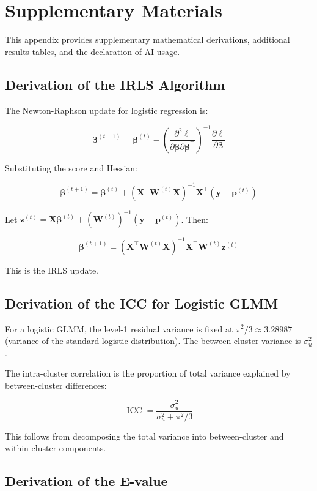 \chapter{Supplementary Materials}

This appendix provides supplementary mathematical derivations, additional results tables, and the declaration of AI usage.

\section{Derivation of the IRLS Algorithm}

The Newton-Raphson update for logistic regression is:

\[
\boldsymbol{\beta}^{(t+1)} = \boldsymbol{\beta}^{(t)} - \left(\frac{\partial^2 \ell}{\partial \boldsymbol{\beta} \partial \boldsymbol{\beta}^\top}\right)^{-1} \frac{\partial \ell}{\partial \boldsymbol{\beta}}
\]

Substituting the score and Hessian:

\[
\boldsymbol{\beta}^{(t+1)} = \boldsymbol{\beta}^{(t)} + (\mathbf{X}^\top \mathbf{W}^{(t)} \mathbf{X})^{-1} \mathbf{X}^\top (\mathbf{y} - \mathbf{p}^{(t)})
\]

Let $\mathbf{z}^{(t)} = \mathbf{X}\boldsymbol{\beta}^{(t)} + (\mathbf{W}^{(t)})^{-1}(\mathbf{y} - \mathbf{p}^{(t)})$. Then:

\[
\boldsymbol{\beta}^{(t+1)} = (\mathbf{X}^\top \mathbf{W}^{(t)} \mathbf{X})^{-1} \mathbf{X}^\top \mathbf{W}^{(t)} \mathbf{z}^{(t)}
\]

This is the IRLS update.

\section{Derivation of the ICC for Logistic GLMM}

For a logistic GLMM, the level-1 residual variance is fixed at $\pi^2/3 \approx 3.28987$ (variance of the standard logistic distribution). The between-cluster variance is $\sigma_u^2$.

The intra-cluster correlation is the proportion of total variance explained by between-cluster differences:

\[
\operatorname{ICC} = \frac{\sigma_u^2}{\sigma_u^2 + \pi^2/3}
\]

This follows from decomposing the total variance into between-cluster and within-cluster components.

\section{Derivation of the E-value}

